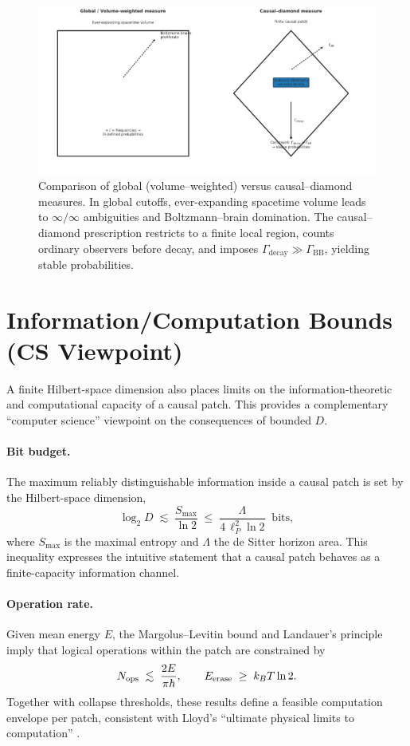 \documentclass[12pt]{article}
\theoremstyle{remark}
\begin{document}
\begin{figure}[t]
  \centering
  \includegraphics[width=0.95\linewidth]{figs/fig_global_vs_diamond.pdf}
  \caption{Comparison of global (volume–weighted) versus causal–diamond measures. 
  In global cutoffs, ever-expanding spacetime volume leads to $\infty/\infty$ ambiguities 
  and Boltzmann–brain domination. 
  The causal–diamond prescription restricts to a finite local region, 
  counts ordinary observers before decay, and imposes 
  $\Gamma_{\mathrm{decay}} \gg \Gamma_{\mathrm{BB}}$, yielding stable probabilities.}
  \label{fig:global-vs-diamond}
\end{figure}

\section{Information/Computation Bounds (CS Viewpoint)}

A finite Hilbert-space dimension also places limits on the information-theoretic and
computational capacity of a causal patch. This provides a complementary ``computer science''
viewpoint on the consequences of bounded $D$.

\paragraph{Bit budget.}
The maximum reliably distinguishable information inside a causal patch is set by the
Hilbert-space dimension,
\[
\log_2 D \;\lesssim\; \frac{S_{\max}}{\ln 2} \;\leq\; \frac{\Lambda}{4 \, \ell_P^2 \ln 2} \;\; \text{bits},
\]
where $S_{\max}$ is the maximal entropy and $\Lambda$ the de Sitter horizon area.
This inequality expresses the intuitive statement that a causal patch behaves as a
finite-capacity information channel.

\paragraph{Operation rate.}
Given mean energy $E$, the Margolus--Levitin bound and Landauer’s principle imply that
logical operations within the patch are constrained by
\[
N_{\rm ops} \;\lesssim\; \frac{2E}{\pi \hbar}, 
\qquad 
E_{\rm erase} \;\geq\; k_B T \ln 2 .
\]
Together with collapse thresholds, these results define a feasible computation envelope
per patch, consistent with Lloyd’s ``ultimate physical limits to computation''
\cite{MargolusLevitin1998,Lloyd2000,Landauer1961}.
\end{document}
